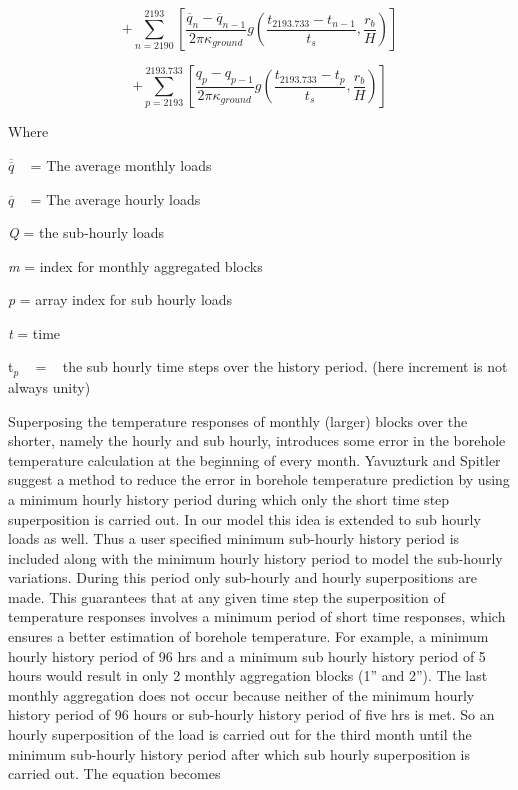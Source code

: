 \begin{equation}
+ \sum\limits_{n = 2190}^{2193} {\left[ {\frac{{{{\overline q }_n} - {{\overline q }_{n - 1}}}}{{2\pi {\kappa_{ground}}}}g\left( {\frac{{{t_{2193.733}} - {t_{n - 1}}}}{{{t_s}}},\frac{{{r_b}}}{H}} \right)} \right]}
\end{equation}

\begin{equation}
+ \sum\limits_{p = 2193}^{2193.733} {\left[ {\frac{{{q_p} - {q_{p - 1}}}}{{2\pi {\kappa_{ground}}}}g\left( {\frac{{{t_{2193.733}} - {t_p}}}{{{t_s}}},\frac{{{r_b}}}{H}} \right)} \right]}
\end{equation}

Where

\(\overline{\overline q}\) ~ = The average monthly loads

\(\overline q\) ~ = The average hourly loads

\emph{Q} = the sub-hourly loads

\emph{m} = index for monthly aggregated blocks

\emph{p} = array index for sub hourly loads

\emph{t} = time

t\(_{p}\) ~ = ~ the sub hourly time steps over the history period. (here increment is not always unity)

Superposing the temperature responses of monthly (larger) blocks over the shorter, namely the hourly and sub hourly, introduces some error in the borehole temperature calculation at the beginning of every month. Yavuzturk and Spitler suggest a method to reduce the error in borehole temperature prediction by using a minimum hourly history period during which only the short time step superposition is carried out. In our model this idea is extended to sub hourly loads as well. Thus a user specified minimum sub-hourly history period is included along with the minimum hourly history period to model the sub-hourly variations. During this period only sub-hourly and hourly superpositions are made. This guarantees that at any given time step the superposition of temperature responses involves a minimum period of short time responses, which ensures a better estimation of borehole temperature. For example, a minimum hourly history period of 96 hrs and a minimum sub hourly history period of 5 hours would result in only 2 monthly aggregation blocks (1'' and 2''). The last monthly aggregation does not occur because neither of the minimum hourly history period of 96 hours or sub-hourly history period of five hrs is met. So an hourly superposition of the load is carried out for the third month until the minimum sub-hourly history period after which sub hourly superposition is carried out. The equation becomes

